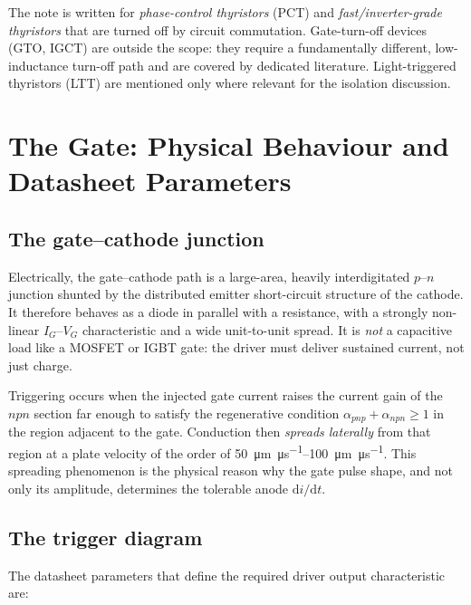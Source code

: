 \documentclass[11pt,a4paper]{article}
\begin{document}
The note is written for \emph{phase-control thyristors} (PCT) and
\emph{fast/inverter-grade thyristors} that are turned off by circuit commutation.
Gate-turn-off devices (GTO, IGCT) are outside the scope: they require a
fundamentally different, low-inductance turn-off path and are covered by dedicated
literature. Light-triggered thyristors (LTT) are mentioned only where relevant for
the isolation discussion.

\section{The Gate: Physical Behaviour and Datasheet Parameters}

\subsection{The gate--cathode junction}

Electrically, the gate--cathode path is a large-area, heavily interdigitated
$p$--$n$ junction shunted by the distributed emitter short-circuit structure of the
cathode. It therefore behaves as a diode in parallel with a resistance, with a
strongly non-linear $I_G$--$V_G$ characteristic and a wide unit-to-unit spread. It
is \emph{not} a capacitive load like a MOSFET or IGBT gate: the driver must deliver
sustained current, not just charge.

Triggering occurs when the injected gate current raises the current gain of the
$npn$ section far enough to satisfy the regenerative condition
$\alpha_{pnp}+\alpha_{npn}\ge 1$ in the region adjacent to the gate. Conduction
then \emph{spreads laterally} from that region at a plate velocity of the order of
\SIrange{50}{100}{\micro\metre\per\micro\second}. This spreading phenomenon is the
physical reason why the gate pulse shape, and not only its amplitude, determines
the tolerable anode $\mathrm{d}i/\mathrm{d}t$.

\subsection{The trigger diagram}

The datasheet parameters that define the required driver output characteristic are:
\end{document}
